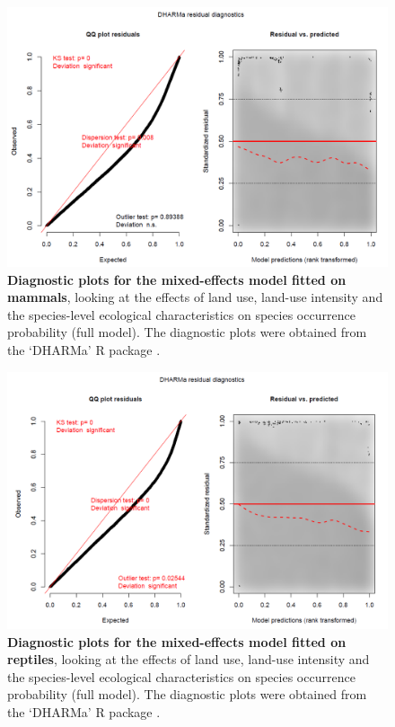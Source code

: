 \documentclass[11pt]{article}
\begin{document}
\begin{figure}[h!]
\centering
\includegraphics[scale=0.5]{Figures/LU_Diag_mammals.png}
\caption[Land-use responses: diagnostic plots for the mixed-effects model fitted on mammals]{\textbf{Diagnostic plots for the mixed-effects model fitted on mammals}, looking at the effects of land use, land-use intensity and the species-level ecological characteristics on species occurrence probability (full model). The diagnostic plots were obtained from the `DHARMa' R package \citep{DHARMa}.}
\label{SI_4_Figure14}
\end{figure}

\begin{figure}[h!]
\centering
\includegraphics[scale=0.5]{Figures/LU_Diag_reptiles.png}
\caption[Land-use responses: diagnostic plots for the mixed-effects model fitted on reptiles]{\textbf{Diagnostic plots for the mixed-effects model fitted on reptiles}, looking at the effects of land use, land-use intensity and the species-level ecological characteristics on species occurrence probability (full model). The diagnostic plots were obtained from the `DHARMa' R package \citep{DHARMa}.}
\label{SI_4_Figure15}
\end{figure}
\end{document}
